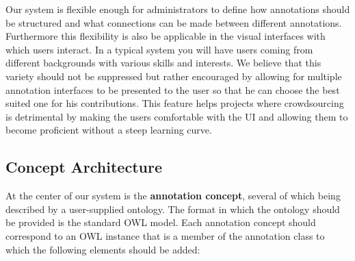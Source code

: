 \documentclass[a4paper, 12pt, notitlepage]{report}
\begin{document}
Our system is flexible enough for administrators to
define how annotations should be structured and what connections can be made between
different annotations.  Furthermore this flexibility is also be applicable in the
visual interfaces with which users interact. In a typical system you will have users
coming from different backgrounds with various skills and interests. We believe that this
variety should not be suppressed but rather encouraged by allowing for multiple annotation
interfaces to be presented to the user so that he can choose the best suited one for his
contributions. This feature helps projects where crowdsourcing is detrimental by making
the users comfortable with the UI and allowing them to become proficient without a steep
learning curve.

\subsection{Concept Architecture}
At the center of our system is the \textbf{annotation concept}, several of which being described by a user-supplied
ontology. The format in which the ontology should be provided is the standard OWL model.
Each annotation concept should correspond to an OWL instance that is a member of the annotation class to which the following elements should be added:\\
\end{document}
